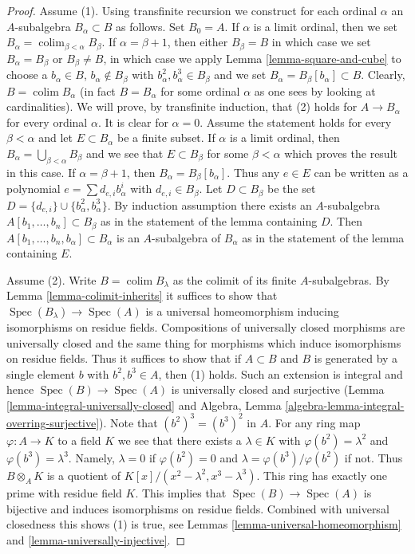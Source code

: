 \documentclass[10pt,a4paper]{amsart}
\theoremstyle{plain}
\theoremstyle{definition}
\theoremstyle{remark}
\numberwithin{equation}{subsection}
\def\colim{\mathop{\mathrm{colim}}\nolimits}
\def\Spec{\mathop{\mathrm{Spec}}}
\begin{document}
\begin{proof}
Assume (1). Using transfinite recursion we construct for each ordinal $\alpha$
an $A$-subalgebra $B_\alpha \subset B$ as follows. Set $B_0 = A$. If $\alpha$
is a limit ordinal, then we set $B_\alpha = \colim_{\beta < \alpha} B_\beta$.
If $\alpha = \beta + 1$, then either
$B_\beta = B$ in which case we set $B_\alpha = B_\beta$ or
$B_\beta \not = B$, in which case we apply Lemma \ref{lemma-square-and-cube}
to choose a $b_\alpha \in B$, $b_\alpha \not \in B_\beta$ with
$b_\alpha^2, b_\alpha^3 \in B_\beta$
and we set $B_\alpha = B_\beta[b_\alpha] \subset B$.
Clearly, $B = \colim B_\alpha$ (in fact $B = B_\alpha$ for some
ordinal $\alpha$ as one sees by looking at cardinalities).
We will prove, by transfinite induction, that (2) holds for
$A \to B_\alpha$ for every ordinal $\alpha$. It is clear for
$\alpha = 0$. Assume the statement holds for every $\beta < \alpha$
and let $E \subset B_\alpha$ be a finite subset.
If $\alpha$ is a limit ordinal, then
$B_\alpha = \bigcup_{\beta < \alpha} B_\beta$ and we see
that $E \subset B_\beta$ for some $\beta < \alpha$ which
proves the result in this case. If $\alpha = \beta + 1$,
then $B_\alpha = B_\beta[b_\alpha]$. Thus any $e \in E$
can be written as a polynomial $e = \sum d_{e, i}b_\alpha^i$
with $d_{e, i} \in B_\beta$. Let $D \subset B_\beta$
be the set $D = \{d_{e, i}\} \cup \{b_\alpha^2, b_\alpha^3\}$.
By induction assumption
there exists an $A$-subalgebra $A[b_1, \ldots, b_n] \subset B_\beta$
as in the statement of the lemma containing $D$.
Then $A[b_1, \ldots, b_n, b_\alpha] \subset B_\alpha$
is an $A$-subalgebra of $B_\alpha$ as in the statement
of the lemma containing $E$.

\medskip\noindent
Assume (2). Write $B = \colim B_\lambda$ as the colimit of its
finite $A$-subalgebras.
By Lemma \ref{lemma-colimit-inherits} it suffices to show
that $\Spec(B_\lambda) \to \Spec(A)$ is a
universal homeomorphism inducing isomorphisms on residue fields.
Compositions of universally closed morphisms are universally closed
and the same thing for morphisms which induce isomorphisms on residue fields.
Thus it suffices to show that if $A \subset B$ and $B$ is generated
by a single element $b$ with $b^2, b^3 \in A$, then (1) holds.
Such an extension is integral and hence $\Spec(B) \to \Spec(A)$ is
universally closed and surjective
(Lemma \ref{lemma-integral-universally-closed} and
Algebra, Lemma \ref{algebra-lemma-integral-overring-surjective}).
Note that $(b^2)^3 = (b^3)^2$ in $A$.
For any ring map $\varphi : A \to K$ to a field $K$ we see that there
exists a $\lambda \in K$ with $\varphi(b^2) = \lambda^2$ and
$\varphi(b^3) = \lambda^3$. Namely, $\lambda = 0$ if $\varphi(b^2) = 0$
and $\lambda = \varphi(b^3)/\varphi(b^2)$ if not. Thus
$B \otimes_A K$ is a quotient of $K[x]/(x^2 - \lambda^2, x^3 - \lambda^3)$.
This ring has exactly one prime with residue field $K$.
This implies that $\Spec(B) \to \Spec(A)$ is bijective and induces
isomorphisms on residue fields. Combined with universal closedness
this shows (1) is true, see Lemmas \ref{lemma-universal-homeomorphism}
and \ref{lemma-universally-injective}.
\end{proof}
\end{document}
